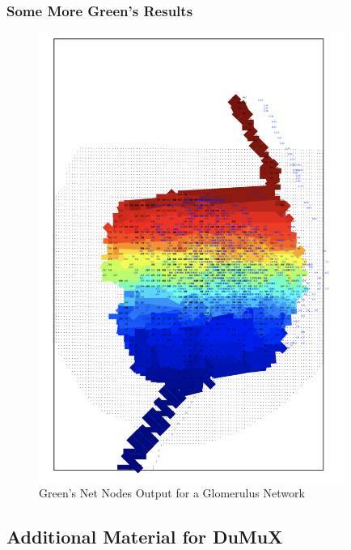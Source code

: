 \subsubsection{Some More Green's Results}

\begin{figure}[h]
\centering
\includegraphics[width=100mm]{NetNodesSegs_Glom}
\caption{\footnotesize Green's Net Nodes Output for a Glomerulus Network}
\label{fig:NetNodesSegs_Glom}
\end{figure}

\subsection{Additional Material for DuMuX}



